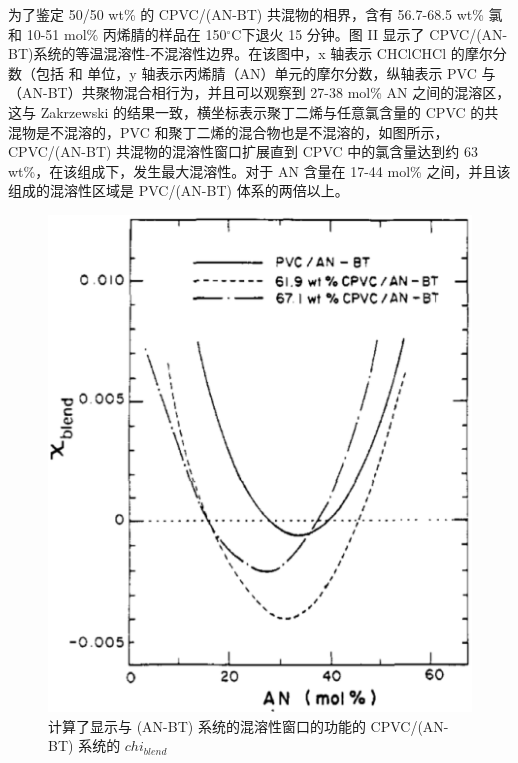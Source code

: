 \documentclass[a4paper,transmag,12pt]{IEEEtran}    %
\newcommand{\cdegree}{$^{\circ}$C}  %
\begin{document}
为了鉴定 50/50 wt\% 的 CPVC/(AN-BT) 共混物的相界，含有 56.7-68.5 wt\% 氯和 10-51 mol\% 丙烯腈的样品在 150\cdegree 下退火 15 分钟。图 II 显示了 CPVC/(AN-BT)系统的等温混溶性-不混溶性边界。在该图中，x 轴表示 CHClCHCl 的摩尔分数（包括  和  单位，y 轴表示丙烯腈（AN）单元的摩尔分数，纵轴表示 PVC 与（AN-BT）共聚物混合相行为，并且可以观察到 27-38 mol\% AN 之间的混溶区，这与 Zakrzewski 的结果一致，横坐标表示聚丁二烯与任意氯含量的 CPVC 的共混物是不混溶的，PVC 和聚丁二烯的混合物也是不混溶的，如图所示，CPVC/(AN-BT) 共混物的混溶性窗口扩展直到 CPVC 中的氯含量达到约 63 wt\%，在该组成下，发生最大混溶性。对于 AN 含量在 17-44 mol\% 之间，并且该组成的混溶性区域是 PVC/(AN-BT) 体系的两倍以上。

\begin{figure}[htb]
    \centering
    \includegraphics[width=.9\linewidth]{src/figure3.eps}
    \caption{计算了显示与 (AN-BT) 系统的混溶性窗口的功能的 CPVC/(AN-BT) 系统的 $chi_{blend}$}
    \centering

\end{figure}
\end{document}
